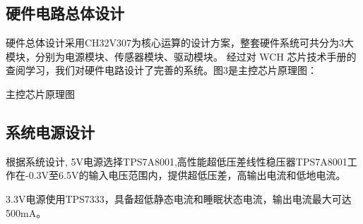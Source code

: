 \documentclass{article}%
\begin{document}
\begin{multicols}{2}
		\subsection{硬件电路总体设计}
		硬件总体设计采用CH32V307为核心运算的设计方案，整套硬件系统可共分为3大模块，分别为电源模块、传感器模块、驱动模块。
		经过对 WCH 芯片技术手册的查阅学习，我们对硬件电路设计了完善的系统。图3是主控芯片原理图：
		\begin{center}
			\caption{主控芯片原理图}		
		\end{center}		
		\subsection{系统电源设计}
		根据系统设计, 5V电源选择TPS7A8001,高性能超低压差线性稳压器TPS7A8001工作在-0.3V至6.5V的输入电压范围内，提供超低压差，高输出电流和低地电流。
		
		3.3V电源使用TPS7333，具备超低静态电流和睡眠状态电流，输出电流最大可达500mA。
		

\end{multicols}
\end{document}
